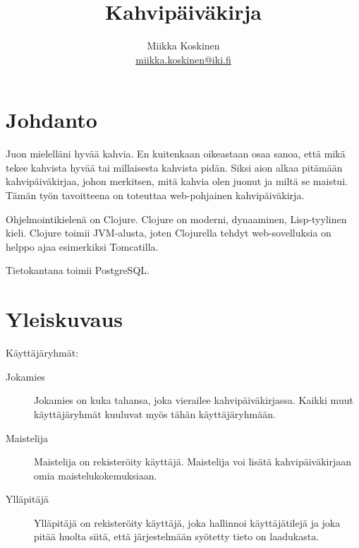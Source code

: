\documentclass[a4paper,titlepage]{article}
\title{Kahvipäiväkirja}
\author{Miikka Koskinen \\ \url{miikka.koskinen@iki.fi}}
\begin{document}
\maketitle
\tableofcontents
\newpage

\section{Johdanto}

Juon mielelläni hyvää kahvia. En kuitenkaan oikeastaan osaa sanoa, että mikä
tekee kahvista hyvää tai millaisesta kahvista pidän. Siksi aion alkaa pitämään
kahvipäiväkirjaa, johon merkitsen, mitä kahvia olen juonut ja miltä se maistui.
Tämän työn tavoitteena on toteuttaa web-pohjainen kahvipäiväkirja.

Ohjelmointikielenä on Clojure. Clojure on moderni, dynaaminen,
Lisp-tyylinen kieli. Clojure toimii JVM-alusta, joten Clojurella
tehdyt web-sovelluksia on helppo ajaa esimerkiksi Tomcatilla.

Tietokantana toimii PostgreSQL.

\section{Yleiskuvaus}

Käyttäjäryhmät:

\begin{description}
    \item[Jokamies]
        Jokamies on kuka tahansa, joka vierailee kahvipäiväkirjassa. Kaikki
        muut käyttäjäryhmät kuuluvat myös tähän käyttäjäryhmään.

    \item[Maistelija]
        Maistelija on rekisteröity käyttäjä. Maistelija voi lisätä
        kahvipäiväkirjaan omia maistelukokemuksiaan.

    \item[Ylläpitäjä]
        Ylläpitäjä on rekisteröity käyttäjä, joka hallinnoi käyttäjätilejä ja
        joka pitää huolta siitä, että järjestelmään syötetty tieto on
        laadukasta.
\end{description}
\end{document}
